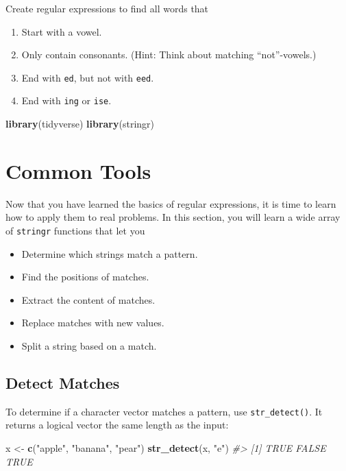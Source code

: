 \documentclass[
]{book}
\newenvironment{Shaded}{\begin{snugshade}}{\end{snugshade}}
\newcommand{\CommentTok}[1]{\textcolor[rgb]{0.56,0.35,0.01}{\textit{#1}}}
\newcommand{\KeywordTok}[1]{\textcolor[rgb]{0.13,0.29,0.53}{\textbf{#1}}}
\newcommand{\NormalTok}[1]{#1}
\newcommand{\StringTok}[1]{\textcolor[rgb]{0.31,0.60,0.02}{#1}}
\providecommand{\tightlist}{%
  \setlength{\itemsep}{0pt}\setlength{\parskip}{0pt}}
\begin{document}
Create regular expressions to find all words that

\begin{enumerate}
\def\labelenumi{\arabic{enumi}.}
\item
  Start with a vowel.
\item
  Only contain consonants. (Hint: Think about matching
  ``not''-vowels.)
\item
  End with \texttt{ed}, but not with \texttt{eed}.
\item
  End with \texttt{ing} or \texttt{ise}.
\end{enumerate}

\begin{Shaded}
\begin{Highlighting}[]
\KeywordTok{library}\NormalTok{(tidyverse)}
\KeywordTok{library}\NormalTok{(stringr)}
\end{Highlighting}
\end{Shaded}

\hypertarget{common-tools}{%
\section{Common Tools}\label{common-tools}}

Now that you have learned the basics of regular expressions, it is time to learn how to apply them to real problems. In this section, you will learn a wide array of \texttt{stringr} functions that let you

\begin{itemize}
\tightlist
\item
  Determine which strings match a pattern.
\item
  Find the positions of matches.
\item
  Extract the content of matches.
\item
  Replace matches with new values.
\item
  Split a string based on a match.
\end{itemize}

\hypertarget{detect-matches}{%
\subsection{Detect Matches}\label{detect-matches}}

To determine if a character vector matches a pattern, use \texttt{str\_detect()}. It returns a logical vector the same length as the input:

\begin{Shaded}
\begin{Highlighting}[]
\NormalTok{x <-}\StringTok{ }\KeywordTok{c}\NormalTok{(}\StringTok{"apple"}\NormalTok{, }\StringTok{"banana"}\NormalTok{, }\StringTok{"pear"}\NormalTok{)}
\KeywordTok{str_detect}\NormalTok{(x, }\StringTok{"e"}\NormalTok{)}
\CommentTok{#> [1]  TRUE FALSE  TRUE}
\end{Highlighting}
\end{Shaded}
\end{document}
